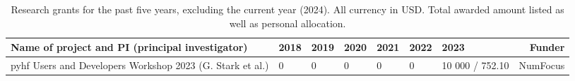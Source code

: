 \begin{table}[h!]
	\footnotesize
	\centering
  \caption{Research grants for the past five years, excluding the current year (2024). All currency in USD. Total awarded amount listed as well as personal allocation.\label{tab:grants}}
	\begin{tabular}{p{8em}|p{4em}|p{4em}|p{4em}|p{4em}|p{4em}|p{4em}|r}
		\rowcolor{black!30}
		\textbf{Name of project and PI (principal investigator)}  & \textbf{2018} & \textbf{2019} & \textbf{2020} & \textbf{2021} & \textbf{2022} & \textbf{2023}   & \textbf{Funder} \\
		\hline
		pyhf Users and Developers Workshop 2023 (G. Stark et al.) & 0             & 0             & 0             & 0             & 0             & 10 000 / 752.10 & NumFocus        \\
	\end{tabular}
\end{table}

